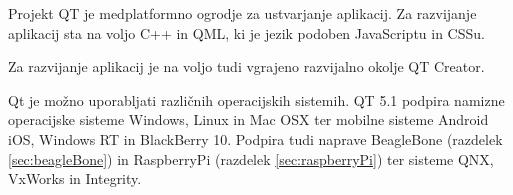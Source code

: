 Projekt QT je medplatformno ogrodje za ustvarjanje aplikacij. Za razvijanje aplikacij sta na voljo C++ in QML, ki je jezik podoben JavaScriptu in CSSu.

Za razvijanje aplikacij je na voljo tudi vgrajeno razvijalno okolje QT Creator.

Qt je možno uporabljati različnih operacijskih sistemih. QT 5.1 podpira namizne operacijske sisteme Windows, Linux in Mac OSX ter mobilne sisteme Android iOS, Windows RT in BlackBerry 10. Podpira tudi naprave BeagleBone (razdelek \ref{sec:beagleBone}) in RaspberryPi (razdelek \ref{sec:raspberryPi}) ter sisteme QNX, VxWorks in Integrity.
